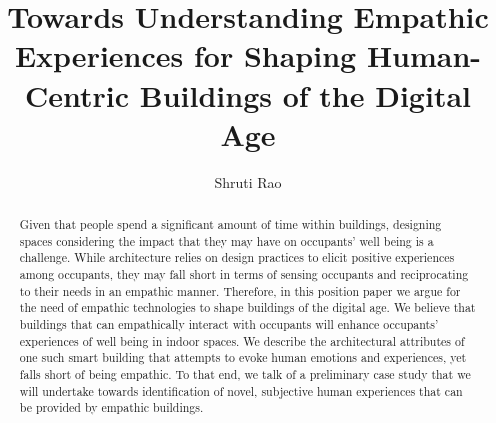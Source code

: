 \documentclass [sigconf, review, anonymous] {acmart}
\begin{document}
\title{Towards Understanding Empathic Experiences for Shaping Human-Centric Buildings of the Digital Age}

\author{Shruti Rao}



\renewcommand{\shortauthors}{Rao et al.}

\begin{abstract}
Given that people spend a significant amount of time within buildings, designing spaces considering the impact that they may have on occupants’ well being is a challenge. While architecture relies on design practices to elicit positive experiences among occupants, they may fall short in terms of sensing occupants and reciprocating to their needs in an empathic manner. Therefore, in this position paper we argue for the need of empathic technologies to shape buildings of the digital age. We believe that buildings that can empathically interact with occupants will enhance occupants’ experiences of well being in indoor spaces. We describe the architectural attributes of one such  smart building that attempts to evoke human emotions and experiences, yet falls short of being empathic. To that end, we talk of a preliminary case study that we will undertake towards identification of novel, subjective human experiences that can be provided by empathic buildings. 
\end{abstract}

\end{document}
